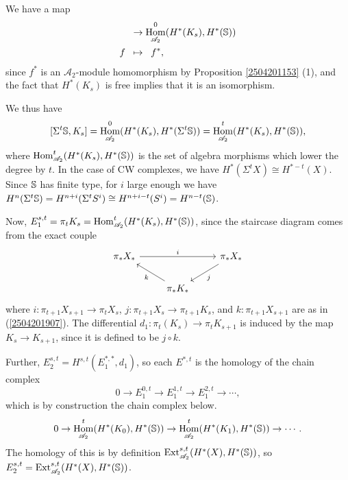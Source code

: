 \documentclass[11pt, titlepage]{article} %
\def\bb{\ensuremath\mathbb}
\def\A{\ensuremath{\mathscr{A}_2}}
\DeclareMathOperator{\Ext}{Ext}
\DeclareMathOperator{\Hom}{Hom}
\def\textcolour{\textcolor}
\numberwithin{equation}{subsection}
\theoremstyle{plain}
\theoremstyle{definition}
\begin{document}
We have a map 
\begin{align*}
[\bb{S}, K_s]&\to \Hom_{\A}^0(H^*(K_s), H^*(\bb{S}))\\
f \;\;&\mapsto\;\; f^*,
\end{align*}
since \(f^*\) is an \(\A\)-module homomorphism by Proposition \ref{2504201153} (1), and the fact that \(H^*(K_s)\) is free implies that it is an isomorphism.

We thus have
\[[\Sigma^t \bb{S}, K_s]=\Hom^0_{\A}(H^*(K_s), H^*(\Sigma^t \bb{S}))=\Hom^t_{\A}(H^*(K_s), H^*(\bb{S})),\]
where \(\Hom^t_{\A}(H^*(K_s), H^*(\bb{S}))\) is the set of algebra morphisms which lower the degree by \(t\). In the case of CW complexes, we have \(H^*(\Sigma^t X)\cong H^{*-t}(X)\). Since \(\bb{S}\) has finite type, for \(i\) large enough we have \(H^n(\Sigma^t\bb{S})=H^{n+i}(\Sigma^t S^i)\cong H^{n+i-t}(S^i)=H^{n-t}(\bb{S})\).

Now, \(E_1^{s,t} = \pi_t K_s =\Hom^t_{\A}(H^*(K_s), H^*(\bb{S}))\), since the staircase diagram comes from %
the exact couple
\[\begin{tikzcd}
 \pi_*X_* \arrow[rr, "i"] & & \pi_* X_* \arrow[dl, "j"] \\ 
 & \pi_*K_* \arrow[ul, "k"] & 
 \end{tikzcd}\]
where \(i : \pi_{t+1}X_{s+1}\to \pi_tX_s\), \(j : \pi_{t+1}X_s \to \pi_{t+1}K_s\), and \(k : \pi_{t+1}X_{s+1}\) are as in (\ref{2504201907}). The differential \(d_1 : \pi_t(K_s)\to\pi_t K_{s+1}\) is induced by the map \(K_s \to K_{s+1}\), since it is defined to be \(j\circ k\).

Further, \(E^{s,t}_2=H^{s,t}(E_1^{*,*}, d_1)\), so each \(E^{*, t}\) is the homology of the chain complex
\[0 \to E^{0,t}_1 \to E^{1,t}_1\to E^{2,t}_1\to \cdots,\]
which is by construction the chain complex below.
\[0 \to \Hom^t_{\A}(H^*(K_0), H^*(\bb{S}))\to \Hom^t_{\A}(H^*(K_1), H^*(\bb{S}))\to \cdots.\]
The homology of this is by definition \(\Ext_{\A}^{s,t}(H^*(X), H^*(\bb{S}))\), so \(E_2^{s,t}=\Ext^{s,t}_{\A}(H^*(X), H^*(\bb{S}))\).
\end{document}
